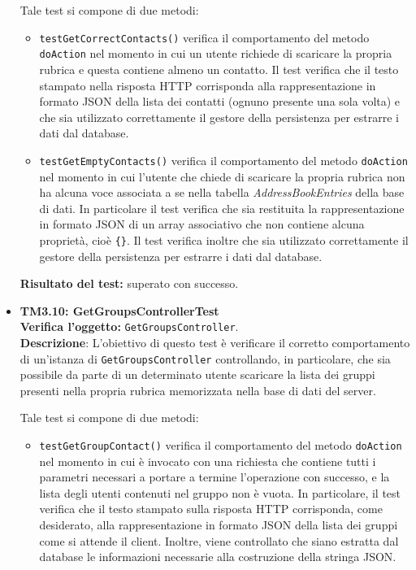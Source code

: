 \begin{itemize}
Tale test si compone di due metodi:
\begin{itemize}
\item \texttt{testGetCorrectContacts()} verifica il comportamento del metodo \texttt{doAction} nel momento in cui un utente richiede di scaricare la propria rubrica e questa contiene almeno un contatto. Il test verifica che il testo stampato nella risposta HTTP corrisponda alla rappresentazione in formato JSON della lista dei contatti (ognuno presente una sola volta) e che sia utilizzato correttamente il gestore della persistenza per estrarre i dati dal database.

\item \texttt{testGetEmptyContacts()} verifica il comportamento del metodo \texttt{doAction} nel momento in cui l'utente che chiede di scaricare la propria rubrica non ha alcuna voce associata a se nella tabella \textit{AddressBookEntries} della base di dati. In particolare il test verifica che sia restituita la rappresentazione in formato JSON di un array associativo che non contiene alcuna proprietà, cioè \texttt{\{\}}. Il test verifica inoltre che sia utilizzato correttamente il gestore della persistenza per estrarre i dati dal database.
\end{itemize}
\textbf{Risultato del test:} superato con successo.


\item[\passed] \textbf{TM3.10: GetGroupsControllerTest}\\
\textbf{Verifica l'oggetto:} \texttt{GetGroupsController}.\\
\textbf{Descrizione}: L'obiettivo di questo test è verificare il corretto comportamento di un'istanza di \texttt{GetGroupsController} controllando, in particolare, che sia possibile da parte di un determinato utente scaricare la lista dei gruppi presenti nella propria rubrica memorizzata nella base di dati del server.

Tale test si compone di due metodi:
\begin{itemize}

\item \texttt{testGetGroupContact()} verifica il comportamento del metodo \texttt{doAction} nel momento in cui è invocato con una richiesta che contiene tutti i parametri necessari a portare a termine l'operazione con successo, e la lista degli utenti contenuti nel gruppo non è vuota. In particolare, il test verifica che il testo stampato sulla risposta HTTP corrisponda, come desiderato, alla rappresentazione in formato JSON della lista dei gruppi come si attende il client. Inoltre, viene controllato che siano estratta dal database le informazioni necessarie alla costruzione della stringa JSON.


\end{itemize}
\end{itemize}
